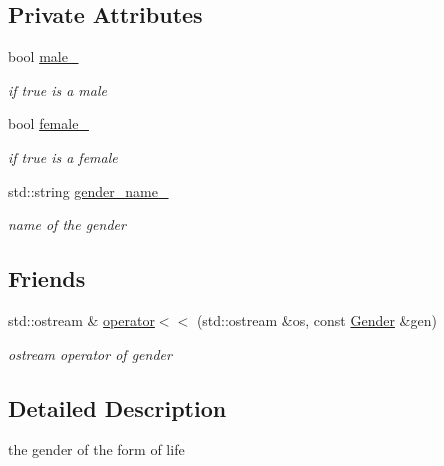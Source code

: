 \subsection*{Private Attributes}
\begin{DoxyCompactItemize}
\item 
\hypertarget{classGender_a57094c4220de22c3f5d2f0876a28695a}{
bool \hyperlink{classGender_a57094c4220de22c3f5d2f0876a28695a}{male\_\-}}
\label{classGender_a57094c4220de22c3f5d2f0876a28695a}

\begin{DoxyCompactList}\small\item\em if true is a male \end{DoxyCompactList}\item 
\hypertarget{classGender_a1f13af5f143d7a202fcf1e406595071f}{
bool \hyperlink{classGender_a1f13af5f143d7a202fcf1e406595071f}{female\_\-}}
\label{classGender_a1f13af5f143d7a202fcf1e406595071f}

\begin{DoxyCompactList}\small\item\em if true is a female \end{DoxyCompactList}\item 
\hypertarget{classGender_a9c64708993b555550d8effa0f5da74c1}{
std::string \hyperlink{classGender_a9c64708993b555550d8effa0f5da74c1}{gender\_\-name\_\-}}
\label{classGender_a9c64708993b555550d8effa0f5da74c1}

\begin{DoxyCompactList}\small\item\em name of the gender \end{DoxyCompactList}\end{DoxyCompactItemize}
\subsection*{Friends}
\begin{DoxyCompactItemize}
\item 
std::ostream \& \hyperlink{classGender_a880decf4751cb0cf4d7b30cfa096a758}{operator$<$$<$} (std::ostream \&os, const \hyperlink{classGender}{Gender} \&gen)
\begin{DoxyCompactList}\small\item\em ostream operator of gender \end{DoxyCompactList}\end{DoxyCompactItemize}


\subsection{Detailed Description}
the gender of the form of life 

